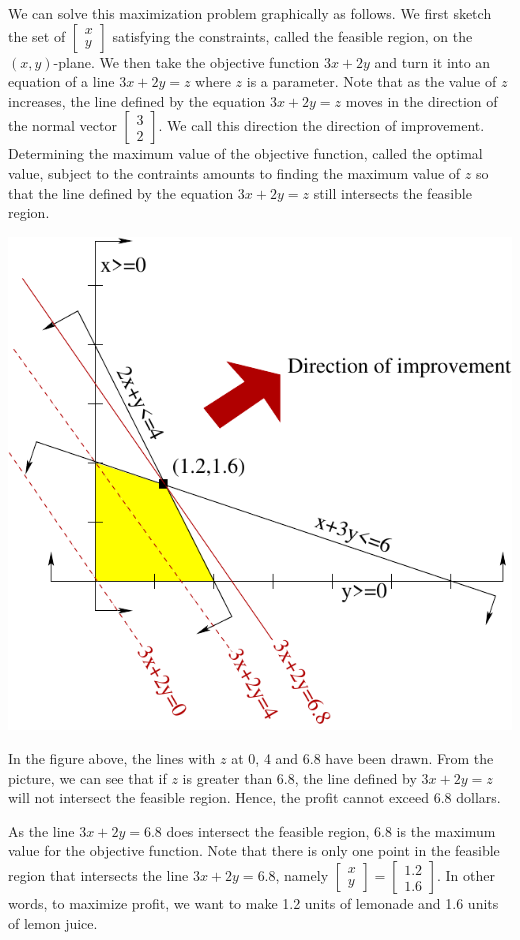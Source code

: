 We can solve this maximization problem graphically as follows. We first
sketch the set of \(\begin{bmatrix} x\\ y\end{bmatrix}\) satisfying the
constraints, called the feasible region, on the \((x,y)\)-plane. We then
take the objective function \(3x+2y\) and turn it into an equation of a
line \(3x+2y = z\) where \(z\) is a parameter. Note that as the value of
\(z\) increases, the line defined by the equation \(3x+2y=z\) moves in
the direction of the normal vector
\(\begin{bmatrix} 3 \\ 2\end{bmatrix}\). We call this direction the
direction of improvement. Determining the maximum value of the objective
function, called the optimal value, subject to the contraints amounts to
finding the maximum value of \(z\) so that the line defined by the
equation \(3x+2y=z\) still intersects the feasible region.

\begin{center}\includegraphics[width=0.8\linewidth]{images/lemon} \end{center}

In the figure above, the lines with \(z\) at 0, 4 and 6.8 have been
drawn. From the picture, we can see that if \(z\) is greater than 6.8,
the line defined by \(3x+2y = z\) will not intersect the feasible
region. Hence, the profit cannot exceed 6.8 dollars.

As the line \(3x+2y = 6.8\) does intersect the feasible region, \(6.8\)
is the maximum value for the objective function. Note that there is only
one point in the feasible region that intersects the line \(3x+2y=6.8\),
namely
\(\begin{bmatrix} x \\ y\end{bmatrix} = \begin{bmatrix} 1.2 \\ 1.6\end{bmatrix}.\)
In other words, to maximize profit, we want to make 1.2 units of
lemonade and 1.6 units of lemon juice.

